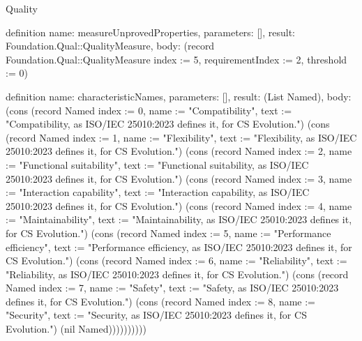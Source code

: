 \begin{lexlean}{Quality}
\begin{semanticmodule}
definition{
  name: measureUnprovedProperties,
  parameters: [],
  result: Foundation.Qual::QualityMeasure,
  body: (record Foundation.Qual::QualityMeasure {index := 5, requirementIndex := 2, threshold := 0})
}

definition{
  name: characteristicNames,
  parameters: [],
  result: (List Named),
  body: (cons (record Named {index := 0, name := "Compatibility", text := "Compatibility, as ISO/IEC 25010:2023 defines it, for CS Evolution."}) (cons (record Named {index := 1, name := "Flexibility", text := "Flexibility, as ISO/IEC 25010:2023 defines it, for CS Evolution."}) (cons (record Named {index := 2, name := "Functional suitability", text := "Functional suitability, as ISO/IEC 25010:2023 defines it, for CS Evolution."}) (cons (record Named {index := 3, name := "Interaction capability", text := "Interaction capability, as ISO/IEC 25010:2023 defines it, for CS Evolution."}) (cons (record Named {index := 4, name := "Maintainability", text := "Maintainability, as ISO/IEC 25010:2023 defines it, for CS Evolution."}) (cons (record Named {index := 5, name := "Performance efficiency", text := "Performance efficiency, as ISO/IEC 25010:2023 defines it, for CS Evolution."}) (cons (record Named {index := 6, name := "Reliability", text := "Reliability, as ISO/IEC 25010:2023 defines it, for CS Evolution."}) (cons (record Named {index := 7, name := "Safety", text := "Safety, as ISO/IEC 25010:2023 defines it, for CS Evolution."}) (cons (record Named {index := 8, name := "Security", text := "Security, as ISO/IEC 25010:2023 defines it, for CS Evolution."}) (nil Named))))))))))
}


\end{semanticmodule}
\end{lexlean}
